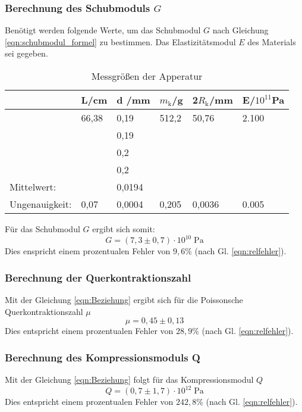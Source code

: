 \newpage
\subsubsection{Berechnung des Schubmoduls $G$}
Benötigt werden folgende Werte, um das Schubmodul $G$ nach Gleichung \ref{eqn:schubmodul_formel}
zu bestimmen.
Das Elastizitätsmodul $E$ des Materials sei gegeben.
\begin{table}
    \centering
    \label{tab:tabelle_1}
    \begin{tabular}{p{3cm} | p{1.5cm} | p{1.5cm} | p{1.5cm} | p{1.5cm} |p{1.5cm}}
    \toprule
    & L\;/\;cm & d \;/\;mm & $m_\text{k}$\;/\;g & 2$R_\text{k}$\;/\;mm & E\;/\;$10^{11}$Pa\\
    \midrule
    &66,38 & 0,19 & 512,2 &  50,76  & 2.100\\
    &      & 0,19 &       &         &\\    
    &      & 0,2  &       &         &\\
    &      & 0,2  &       &         &\\
    \midrule
    Mittelwert:    &      & 0,0194 &       &        &\\
    Ungenauigkeit: & 0,07 & 0,0004 & 0,205 & 0,0036 & 0.005\\
    \bottomrule
    \end{tabular}
    \caption{Messgrößen der Apperatur}
    \label{tab:tabelle_2}
\end{table}

Für das Schubmodul $G$ ergibt sich somit:
\begin{equation*}
    G = (7,3 \pm 0,7 )\cdot 10^{10}\;\mathrm{Pa}
\end{equation*}
Dies enspricht einem prozentualen Fehler von $9,6\%$ (nach Gl. \ref{eqn:relfehler}).

\subsubsection{Berechnung der Querkontraktionszahl}
Mit der Gleichung \ref{eqn:Beziehung} ergibt sich für die Poissonsche Querkontraktionszahl $\mu$
\begin{equation*}
    \mu = 0,45 \pm 0,13 %
\end{equation*}
Dies entspricht einem prozentualen Fehler von $28,9\%$ (nach Gl. \ref{eqn:relfehler}).

\subsubsection{Berechnung des Kompressionsmoduls Q}
Mit der Gleichung \ref{eqn:Beziehung} 
folgt für das Kompressionsmodul $Q$
\begin{equation*}
    Q = (0,7 \pm 1,7) \cdot 10^{12} \;\mathrm{Pa}
\end{equation*}
Dies entspricht einem prozentualen Fehler von $242,8\%$ (nach Gl. \ref{eqn:relfehler}).\\

